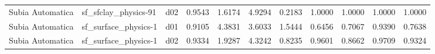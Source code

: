 \begin{longtable}{lllrrrrrrrr}
     Subia Automatica  &  sf\_sfclay\_physics-91 &     d02 &   0.9543 &   1.6174 &   4.9294 &       0.2183 &        1.0000 &       1.0000 &           1.0000 &  1.0000 \\
     Subia Automatica  &  sf\_surface\_physics-1 &     d01 &   0.9105 &   4.3831 &   3.6033 &       1.5444 &        0.6456 &       0.7067 &           0.9390 &  0.7638 \\
     Subia Automatica  &  sf\_surface\_physics-1 &     d02 &   0.9334 &   1.9287 &   4.3242 &       0.8235 &        0.9601 &       0.8662 &           0.9709 &  0.9324 \\
\end{longtable}

